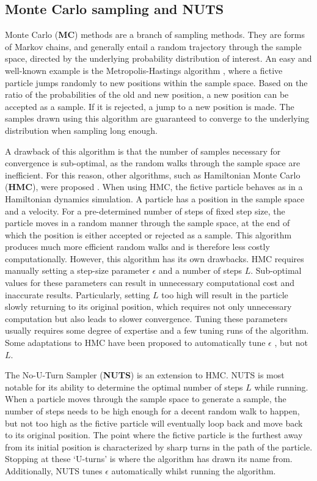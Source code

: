 \subsection{Monte Carlo sampling and NUTS}\label{sec:nuts}
Monte Carlo (\textbf{MC}) methods are a branch of sampling methods. They are forms of Markov chains, and generally entail a random trajectory through the sample space, directed by the underlying probability distribution of interest. An easy and well-known example is the Metropolis-Hastings algorithm \cite{metropolis1953equation, hastings1970monte}, where a fictive particle jumps randomly to new positions within the sample space. Based on the ratio of the probabilities of the old and new position, a new position can be accepted as a sample. If it is rejected, a jump to a new position is made. The samples drawn using this algorithm are guaranteed to converge to the underlying distribution when sampling long enough.

A drawback of this algorithm is that the number of samples necessary for convergence is sub-optimal, as the random walks through the sample space are inefficient. For this reason, other algorithms, such as Hamiltonian Monte Carlo (\textbf{HMC}), were proposed \cite{duane1987hybrid}. When using HMC, the fictive particle behaves as in a Hamiltonian dynamics simulation. A particle has a position in the sample space and a velocity. For a pre-determined number of steps of fixed step size, the particle moves in a random manner through the sample space, at the end of which the position is either accepted or rejected as a sample. This algorithm produces much more efficient random walks and is therefore less costly computationally. However, this algorithm has its own drawbacks. HMC requires manually setting a step-size parameter $\epsilon$ and a number of steps $L$. Sub-optimal values for these parameters can result in unnecessary computational cost and inaccurate results. Particularly, setting $L$ too high will result in the particle slowly returning to its original position, which requires not only unnecessary computation but also leads to slower convergence. Tuning these parameters usually requires some degree of expertise and a few tuning runs of the algorithm. Some adaptations to HMC have been proposed to automatically tune $\epsilon$ \cite{nesterov2009primal}, but not $L$.

The No-U-Turn Sampler \cite{hoffman2014no} (\textbf{NUTS}) is an extension to HMC. NUTS is most notable for its ability to determine the optimal number of steps $L$ while running. When a particle moves through the sample space to generate a sample, the number of steps needs to be high enough for a decent random walk to happen, but not too high as the fictive particle will eventually loop back and move back to its original position. The point where the fictive particle is the furthest away from its initial position is characterized by sharp turns in the path of the particle. Stopping at these `U-turns' is where the algorithm has drawn its name from. Additionally, NUTS tunes $\epsilon$ automatically whilst running the algorithm.

